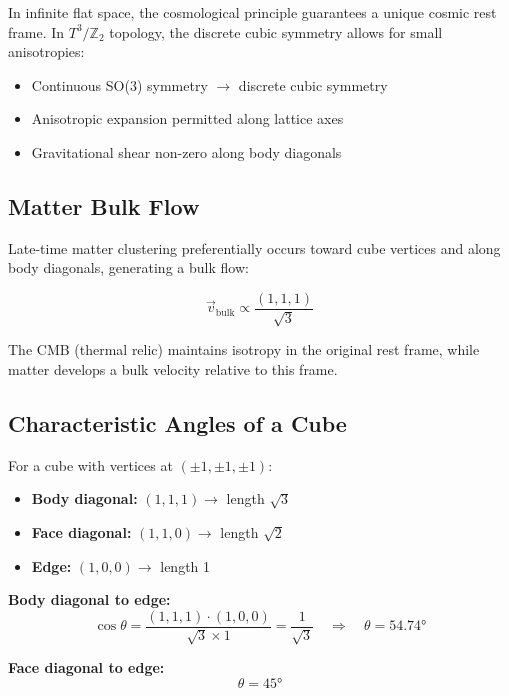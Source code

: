 \documentclass[12pt,a4paper]{article}
\begin{document}
In infinite flat space, the cosmological principle guarantees a unique cosmic rest frame. In $T^3/\mathbb{Z}_2$ topology, the discrete cubic symmetry allows for small anisotropies:

\begin{itemize}
    \item Continuous SO(3) symmetry $\rightarrow$ discrete cubic symmetry
    \item Anisotropic expansion permitted along lattice axes
    \item Gravitational shear non-zero along body diagonals
\end{itemize}

\subsection{Matter Bulk Flow}

Late-time matter clustering preferentially occurs toward cube vertices and along body diagonals, generating a bulk flow:

\begin{equation}
\vec{v}_{\text{bulk}} \propto \frac{(1, 1, 1)}{\sqrt{3}}
\end{equation}

The CMB (thermal relic) maintains isotropy in the original rest frame, while matter develops a bulk velocity relative to this frame.

\subsection{Characteristic Angles of a Cube}

For a cube with vertices at $(\pm 1, \pm 1, \pm 1)$:

\begin{itemize}
    \item \textbf{Body diagonal:} $(1,1,1) \rightarrow$ length $\sqrt{3}$
    \item \textbf{Face diagonal:} $(1,1,0) \rightarrow$ length $\sqrt{2}$
    \item \textbf{Edge:} $(1,0,0) \rightarrow$ length 1
\end{itemize}

\textbf{Body diagonal to edge:}
\begin{equation}
\cos\theta = \frac{(1,1,1) \cdot (1,0,0)}{\sqrt{3} \times 1} = \frac{1}{\sqrt{3}} \quad \Rightarrow \quad \theta = 54.74°
\end{equation}

\textbf{Face diagonal to edge:}
\begin{equation}
\theta = 45°
\end{equation}
\end{document}
